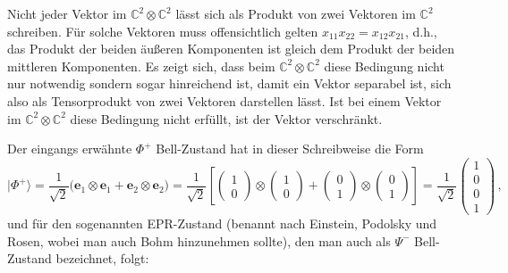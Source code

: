 Nicht jeder Vektor im $\mathbb{C}^2 \otimes \mathbb{C}^2$ l\"asst sich als
Produkt von zwei Vektoren im $\mathbb{C}^2$ schreiben. F\"ur solche Vektoren muss
offensichtlich gelten $x_{11} x_{22} = x_{12} x_{21}$, d.h., das Produkt der beiden \"au\ss eren
Komponenten ist gleich dem Produkt der beiden mittleren Komponenten. Es zeigt sich, dass beim
$\mathbb{C}^2 \otimes \mathbb{C}^2$ diese Bedingung nicht nur notwendig sondern
sogar hinreichend ist, damit ein Vektor separabel ist, sich also als Tensorprodukt von
zwei Vektoren darstellen l\"asst. Ist bei einem Vektor im $\mathbb{C}^2 \otimes \mathbb{C}^2$
diese Bedingung nicht erf\"ullt, ist der Vektor verschr\"ankt. 

Der eingangs erw\"ahnte $\Phi^+$ Bell-Zustand hat in dieser Schreibweise die Form
\begin{equation}
       |\Phi^+\rangle = \frac{1}{\sqrt{2}} \big( \pmb{e}_1 \otimes \pmb{e}_1 + \pmb{e}_2 \otimes \pmb{e}_2 \big)
         = \frac{1}{\sqrt{2}} \left[ \left( \begin{array}{c} 1 \\ 0 \end{array} \right)
       \otimes   \left( \begin{array}{c} 1 \\ 0 \end{array} \right) +  \left( \begin{array}{c} 0 \\ 1 \end{array} \right)
       \otimes   \left( \begin{array}{c} 0 \\ 1 \end{array} \right) \right]
       =   \frac{1}{\sqrt{2}} 
        \left( \begin{array}{c} 1 \\ 0 \\ 0 \\ 1 \end{array} \right) \, ,
\end{equation}
und f\"ur den sogenannten EPR-Zustand (benannt nach Einstein, Podolsky und Rosen, wobei man auch
Bohm hinzunehmen sollte), den man auch als $\Psi^-$ Bell-Zustand bezeichnet, folgt:
